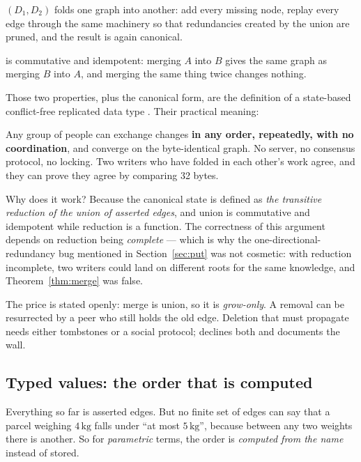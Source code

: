 $(D_1, D_2)$ folds one graph into another: add every missing node,
replay every edge through the same  machinery so that redundancies
created by the union are pruned, and the result is again canonical.

\begin{theorem}
\label{thm:merge}
 is commutative and idempotent: merging $A$ into $B$ gives the same
graph as merging $B$ into $A$, and merging the same thing twice changes
nothing.
\end{theorem}

Those two properties, plus the canonical form, are the definition of a
state-based conflict-free replicated data type \citep{shapiro2011}. Their
practical meaning:

\begin{keyidea}
Any group of people can exchange changes \textbf{in any order, repeatedly,
with no coordination}, and converge on the byte-identical graph. No server, no
consensus protocol, no locking. Two writers who have folded in each other's
work agree, and they can prove they agree by comparing 32 bytes.
\end{keyidea}

Why does it work? Because the canonical state is defined as \emph{the
transitive reduction of the union of asserted edges}, and union is
commutative and idempotent while reduction is a function. The correctness of
this argument depends on reduction being \emph{complete} --- which is why the
one-directional-redundancy bug mentioned in Section~\ref{sec:put} was not
cosmetic: with reduction incomplete, two writers could land on different roots
for the same knowledge, and Theorem~\ref{thm:merge} was false.

The price is stated openly: merge is union, so it is \emph{grow-only}. A
removal can be resurrected by a peer who still holds the old edge. Deletion
that must propagate needs either tombstones or a social protocol; \odag{}
declines both and documents the wall.

\subsection{Typed values: the order that is computed}
\label{sec:dimensions}

Everything so far is asserted edges. But no finite set of edges can say that a
parcel weighing $4\,\mathrm{kg}$ falls under ``at most $5\,\mathrm{kg}$'',
because between any two weights there is another. So for \emph{parametric}
terms, the order is \emph{computed from the name} instead of stored.


